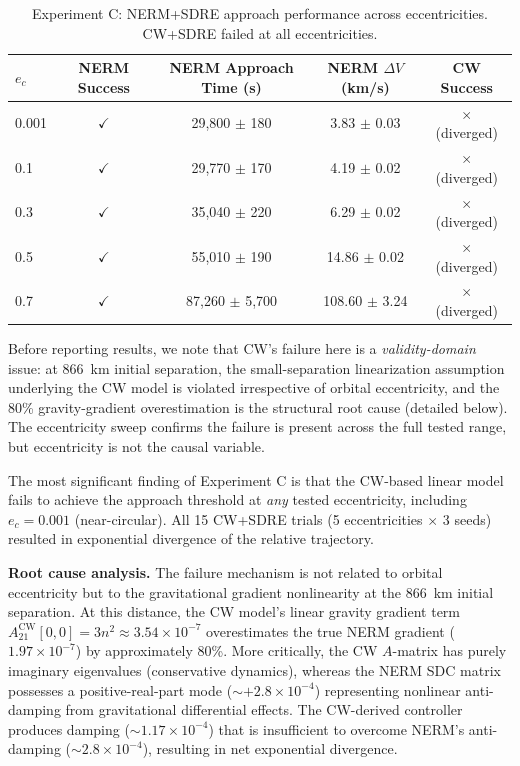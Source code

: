\documentclass[preprint,3p,times]{elsarticle}
\begin{document}
\begin{table}[h]
\centering
\caption{Experiment C: NERM+SDRE approach performance across eccentricities. CW+SDRE failed at all eccentricities.}
\label{tab:expC}
\begin{tabular}{lcccc}
\toprule
$e_c$ & NERM Success & NERM Approach Time (s) & NERM $\Delta V$ (km/s) & CW Success \\
\midrule
0.001 & $\checkmark$ & 29,800 $\pm$ 180 & 3.83 $\pm$ 0.03 & $\times$ (diverged) \\
0.1   & $\checkmark$ & 29,770 $\pm$ 170 & 4.19 $\pm$ 0.02 & $\times$ (diverged) \\
0.3   & $\checkmark$ & 35,040 $\pm$ 220 & 6.29 $\pm$ 0.02 & $\times$ (diverged) \\
0.5   & $\checkmark$ & 55,010 $\pm$ 190 & 14.86 $\pm$ 0.02 & $\times$ (diverged) \\
0.7   & $\checkmark$ & 87,260 $\pm$ 5,700 & 108.60 $\pm$ 3.24 & $\times$ (diverged) \\
\bottomrule
\end{tabular}
\end{table}

Before reporting results, we note that CW's failure here is a \emph{validity-domain} issue: at 866~km initial separation, the small-separation linearization assumption underlying the CW model is violated irrespective of orbital eccentricity, and the 80\% gravity-gradient overestimation is the structural root cause (detailed below). The eccentricity sweep confirms the failure is present across the full tested range, but eccentricity is not the causal variable.

The most significant finding of Experiment C is that the CW-based linear model fails to achieve the approach threshold at \emph{any} tested eccentricity, including $e_c = 0.001$ (near-circular). All 15 CW+SDRE trials (5 eccentricities $\times$ 3 seeds) resulted in exponential divergence of the relative trajectory.

\textbf{Root cause analysis.} The failure mechanism is not related to orbital eccentricity but to the gravitational gradient nonlinearity at the 866~km initial separation. At this distance, the CW model's linear gravity gradient term $A_{21}^{\text{CW}}[0,0] = 3n^2 \approx 3.54 \times 10^{-7}$ overestimates the true NERM gradient ($1.97 \times 10^{-7}$) by approximately 80\%. More critically, the CW $A$-matrix has purely imaginary eigenvalues (conservative dynamics), whereas the NERM SDC matrix possesses a positive-real-part mode (${\sim}{+}2.8 \times 10^{-4}$) representing nonlinear anti-damping from gravitational differential effects. The CW-derived controller produces damping (${\sim}1.17 \times 10^{-4}$) that is insufficient to overcome NERM's anti-damping (${\sim}2.8 \times 10^{-4}$), resulting in net exponential divergence.
\end{document}
